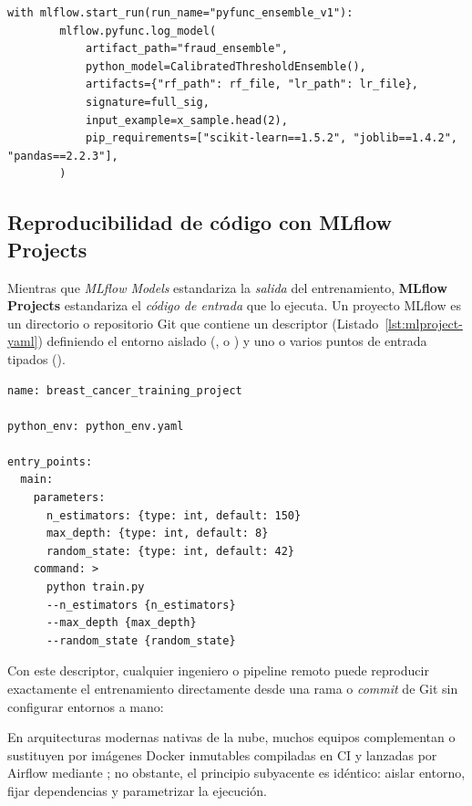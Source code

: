\begin{lstlisting}[style=python, caption={Implementación y registro de un modelo personalizado con mlflow.pyfunc que combina dos modelos y aplica un umbral de decisión configurable.}, label={lst:mlflow-pyfunc-custom}]
    with mlflow.start_run(run_name="pyfunc_ensemble_v1"):
        mlflow.pyfunc.log_model(
            artifact_path="fraud_ensemble",
            python_model=CalibratedThresholdEnsemble(),
            artifacts={"rf_path": rf_file, "lr_path": lr_file},
            signature=full_sig,
            input_example=x_sample.head(2),
            pip_requirements=["scikit-learn==1.5.2", "joblib==1.4.2", "pandas==2.2.3"],
        )
\end{lstlisting}

\subsection{Reproducibilidad de código con MLflow Projects}

Mientras que \textit{MLflow Models} estandariza la \textit{salida} del entrenamiento, \textbf{MLflow Projects} estandariza el \textit{código de entrada} que lo ejecuta. Un proyecto MLflow es un directorio o repositorio Git que contiene un descriptor  (Listado~\ref{lst:mlproject-yaml}) definiendo el entorno aislado (,  o ) y uno o varios puntos de entrada tipados ().

\begin{lstlisting}[style=yaml, caption={Descriptor MLproject para ejecución reproducible y parametrizada desde CLI o Git.}, label={lst:mlproject-yaml}]
name: breast_cancer_training_project

python_env: python_env.yaml

entry_points:
  main:
    parameters:
      n_estimators: {type: int, default: 150}
      max_depth: {type: int, default: 8}
      random_state: {type: int, default: 42}
    command: >
      python train.py
      --n_estimators {n_estimators}
      --max_depth {max_depth}
      --random_state {random_state}
\end{lstlisting}

Con este descriptor, cualquier ingeniero o pipeline remoto puede reproducir exactamente el entrenamiento directamente desde una rama o \textit{commit} de Git sin configurar entornos a mano:
\begin{center}
\end{center}
En arquitecturas modernas nativas de la nube, muchos equipos complementan o sustituyen  por imágenes Docker inmutables compiladas en CI y lanzadas por Airflow mediante ; no obstante, el principio subyacente es idéntico: aislar entorno, fijar dependencias y parametrizar la ejecución.

